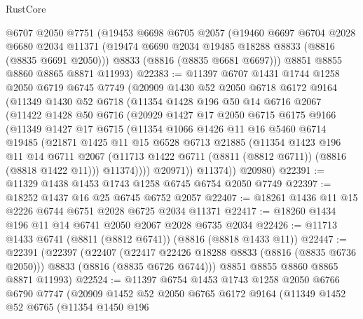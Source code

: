\begin{lexlean}{RustCore}
\begin{coremodule}
    @6707
    @2050
    @7751
    (@19453
      @6698
      @6705
      @2057
      (@19460
        @6697
        @6704
        @2028
        @6680
        @2034
        @11371
        (@19474 @6690 @2034 @19485 @18288 @8833 (@8816 (@8835 @6691 @2050)))
        @8833
        (@8816 (@8835 @6681 @6697)))
      @8851
      @8855
      @8860
      @8865
      @8871
      @11993)
@22383 := @11397
    @6707
    @1431
    @1744
    @1258
    @2050
    @6719
    @6745
    @7749
    (@20909
      @1430
      @52
      @2050
      @6718
      @6172
      @9164
      (@11349
        @1430
        @52
        @6718
        (@11354
          @1428
          @196
          @50
          @14
          @6716
          @2067
          (@11422
            @1428
            @50
            @6716
            (@20929
              @1427
              @17
              @2050
              @6715
              @6175
              @9166
              (@11349
                @1427
                @17
                @6715
                (@11354
                  @1066
                  @1426
                  @11
                  @16
                  @5460
                  @6714
                  @19485
                  (@21871
                    @1425
                    @11
                    @15
                    @6528
                    @6713
                    @21885
                    (@11354
                      @1423
                      @196
                      @11
                      @14
                      @6711
                      @2067
                      (@11713 @1422 @6711 (@8811 (@8812 @6711)) (@8816 (@8818 @1422 @11)))
                      @11374))))
              @20971))
          @11374))
      @20980)
@22391 := @11329 @1438 @1453 @1743 @1258 @6745 @6754 @2050 @7749
@22397 := @18252 @1437 @16 @25 @6745 @6752 @2057
@22407 := @18261 @1436 @11 @15 @2226 @6744 @6751 @2028 @6725 @2034 @11371
@22417 := @18260 @1434 @196 @11 @14 @6741 @2050 @2067 @2028 @6735 @2034
@22426 := @11713 @1433 @6741 (@8811 (@8812 @6741)) (@8816 (@8818 @1433 @11))
@22447 := @22391
    (@22397
      (@22407
        (@22417 @22426 @18288 @8833 (@8816 (@8835 @6736 @2050)))
        @8833
        (@8816 (@8835 @6726 @6744)))
      @8851
      @8855
      @8860
      @8865
      @8871
      @11993)
@22524 := @11397
    @6754
    @1453
    @1743
    @1258
    @2050
    @6766
    @6790
    @7747
    (@20909
      @1452
      @52
      @2050
      @6765
      @6172
      @9164
      (@11349
        @1452
        @52
        @6765
        (@11354
          @1450
          @196

\end{coremodule}
\end{lexlean}
